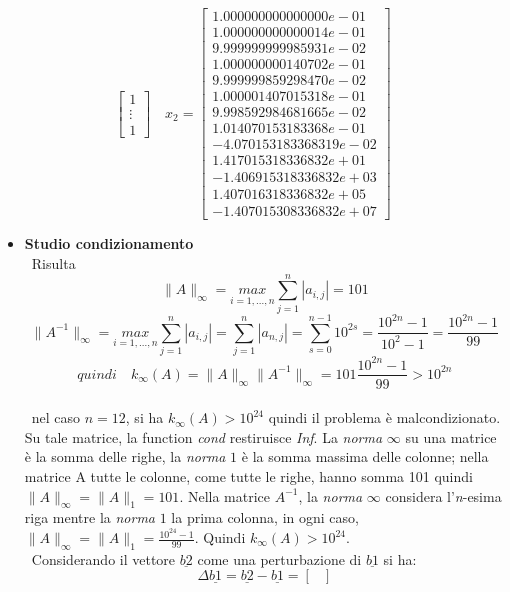 \begin{itemize}
\[\begin{bmatrix}
  			1   \\
  			\vdots  \\
  			1
  		\end{bmatrix} \quad
  		x_2 = \begin{bmatrix}
  		    1.000000000000000e-01 \\
  			1.000000000000014e-01 \\
  			9.999999999985931e-02 \\
  			1.000000000140702e-01 \\
  			9.999999859298470e-02 \\
     		1.000001407015318e-01 \\
     		9.998592984681665e-02 \\
     		1.014070153183368e-01 \\
    		-4.070153183368319e-02 \\
    		1.417015318336832e+01 \\
    		-1.406915318336832e+03 \\
     		1.407016318336832e+05 \\
     		-1.407015308336832e+07
  		\end{bmatrix}
  		\]
	\begin{itemize}
		\item \textbf{Studio condizionamento}\\\
			Risulta
				\[
					\|A\|_\infty = \underset{i=1,...,n}{max} \sum_{j=1}^n|a_{i,j}|=101
				\]
				\[
					\|A^{-1}\|_\infty = \underset{i=1,...,n}{max} \sum_{j=1}^n|a_{i,j}|=\sum_{j=1}^n|a_{n,j}|=\sum_{s=0}^{n-1}10^{2s}=\frac{10^{2n}-1}{10^2-1}=\frac{10^{2n}-1}{99}
				\]
				\[
					quindi 
					\quad
					k_\infty(A) = \|A\|_\infty \|A^{-1}\|_\infty=101\frac{10^{2n}-1}{99}>10^{2n}
				\]\\\
			nel caso $n=12$, si ha $k_\infty(A)>10^{24}$ quindi il problema è malcondizionato. Su tale matrice, la function \textit{cond} restiruisce \textit{Inf}.
			La \textit{norma} $\infty$ su una matrice è la somma delle righe, la \textit{norma} $1$ è la somma massima delle colonne; nella matrice A tutte le colonne, come tutte le righe, hanno somma 101 quindi $\|A\|_\infty=\|A\|_1=101$. Nella matrice $A^{-1}$, la \textit{norma} $\infty$ considera l'\textit{n}-esima riga mentre la \textit{norma} $1$ la prima colonna, in ogni caso, $\|A\|_\infty=\|A\|_1=\frac{10^{24}-1}{99}$. Quindi $k_\infty(A)>10^{24}$.\\\
			Considerando il vettore $\underline{b2}$ come una perturbazione di $\underline{b1}$ si ha:
			\[
				\Delta\underline{b1}=\underline{b2}-\underline{b1}=\begin{bmatrix}

\end{bmatrix}\]
\end{itemize}
\end{itemize}
